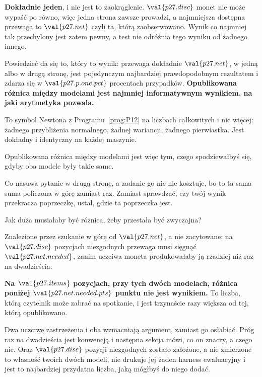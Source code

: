 \begin{fr}


\textbf{Dokładnie jeden}, i nie jest to zaokrąglenie. $\val{p27.disc}$ monet
nie może wypaść po równo, więc jedna strona zawsze prowadzi, a najmniejsza
dostępna przewaga to $\val{p27.net}$ \dash{} czyli ta, którą
zaobserwowano. Wynik co najmniej tak przechylony jest zatem pewny, a test nie
odróżnia tego wyniku od żadnego innego.

Powiedzieć da się to, który to wynik: przewaga dokładnie
$\val{p27.net}$, w jedną albo w drugą stronę, jest pojedynczym najbardziej
prawdopodobnym rezultatem i zdarza się w $\val{p27.p.one.pct}$ procentach
przypadków. \textbf{Opublikowana różnica między modelami jest najmniej
informatywnym wynikiem, na jaki arytmetyka pozwala.}

To symbol Newtona z Programu~\ref{prog:P12} na liczbach całkowitych i nic
więcej: żadnego przybliżenia normalnego, żadnej wariancji, żadnego
pierwiastka. Jest dokładny i identyczny na każdej maszynie.

Opublikowana różnica między modelami jest więc tym, czego spodziewałbyś się,
gdyby oba modele były takie same.

Co nasuwa pytanie w drugą stronę, a zadanie go nic nie kosztuje, bo to ta sama
suma policzona w górę zamiast raz. Zamiast sprawdzać, czy twój wynik
przekracza poprzeczkę, ustal, gdzie ta poprzeczka jest.

Jak duża musiałaby być różnica, żeby przestała być zwyczajna?
\dotline
\nextframe
\end{fr}

\begin{fr}

Znalezione przez szukanie w górę od $\val{p27.net}$, a nie zacytowane: na
$\val{p27.disc}$ pozycjach niezgodnych przewaga musi sięgnąć
$\val{p27.net.needed}$, zanim uczciwa moneta produkowałaby ją rzadziej niż raz
na dwadzieścia.

\textbf{Na $\val{p27.items}$ pozycjach, przy tych dwóch modelach, różnica
poniżej $\val{p27.net.needed.pts}$ punktu nie jest wynikiem.} To liczba, którą
czytelnik może zabrać na spotkanie, i jest trzynaście razy większa od tej,
którą opublikowano.

Dwa uczciwe zastrzeżenia i oba wzmacniają argument, zamiast go osłabiać. Próg
raz na dwadzieścia jest konwencją i następna sekcja mówi, co on znaczy, a
czego nie. Oraz $\val{p27.disc}$ pozycji niezgodnych zostało założone, a nie
zmierzone \dash{} to własność twoich dwóch modeli, nie drukuje jej żaden
harness ewaluacyjny i jest to najbardziej przydatna liczba, jaką mógłbyś do
niego dodać.
\end{fr}

